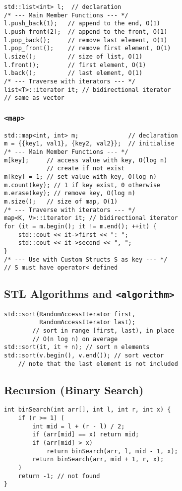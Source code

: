 \begin{verbatim}
std::list<int> l;  // declaration
/* --- Main Member Functions --- */
l.push_back(1);   // append to the end, O(1)
l.push_front(2);  // append to the front, O(1)
l.pop_back();     // remove last element, O(1)
l.pop_front();    // remove first element, O(1)
l.size();         // size of list, O(1)
l.front();        // first element, O(1)
l.back();         // last element, O(1)
/* --- Traverse with iterators --- */
list<T>::iterator it; // bidirectional iterator
// same as vector
\end{verbatim}
\vspace*{-1.25\baselineskip}

\subsubsection*{\texttt{<map>}}

\begin{verbatim}
std::map<int, int> m;              // declaration
m = {{key1, val1}, {key2, val2}};  // initialise
/* --- Main Member Functions --- */
m[key];     // access value with key, O(log n)
            // create if not exist
m[key] = 1; // set value with key, O(log n)
m.count(key); // 1 if key exist, 0 otherwise
m.erase(key); // remove key, O(log n)
m.size();   // size of map, O(1)
/* --- Traverse with iterators --- */
map<K, V>::iterator it; // bidirectional iterator
for (it = m.begin(); it != m.end(); ++it) {
    std::cout << it->first << ": ";
    std::cout << it->second << ", ";
}
/* --- Use with Custom Structs S as key --- */
// S must have operator< defined
\end{verbatim}
\vspace*{-1.25\baselineskip}

\subsection*{STL Algorithms and \texttt{<algorithm>}}

\begin{verbatim}
std::sort(RandomAccessIterator first,
          RandomAccessIterator last);
        // sort in range [first, last), in place
        // O(n log n) on average
std::sort(it, it + n); // sort n elements
std::sort(v.begin(), v.end()); // sort vector
    // note that the last element is not included
\end{verbatim}
\vspace*{-1.25\baselineskip}

\subsection*{Recursion (Binary Search)}
\begin{verbatim}
int binSearch(int arr[], int l, int r, int x) {
    if (r >= 1) (
        int mid = l + (r - l) / 2;
        if (arr[mid] == x) return mid;
        if (arr[mid] > x)
            return binSearch(arr, l, mid - 1, x);
        return binSearch(arr, mid + 1, r, x);
    )
    return -1; // not found
}
\end{verbatim}
\vspace*{-1.25\baselineskip}